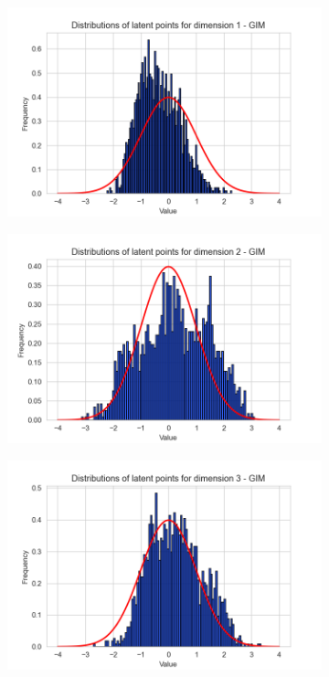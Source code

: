 \begin{figure}[h]
	\centering
	\begin{subfigure}[b]{0.25\textwidth}
		\centering
		\includegraphics[width=1\linewidth]{"graphs/distr/module2 kld0035/_ distribution_latent_space_GIM_dim=0"}
	\end{subfigure}
	\hfill
	\begin{subfigure}[b]{0.25\textwidth}
		\centering
		\includegraphics[width=1\linewidth]{"graphs/distr/module2 kld0035/_ distribution_latent_space_GIM_dim=1"}
	\end{subfigure}
	\hfill
	\begin{subfigure}[b]{0.25\textwidth}
		\centering
		\includegraphics[width=1\linewidth]{"graphs/distr/module2 kld0035/_ distribution_latent_space_GIM_dim=2"}

\end{subfigure}
\end{figure}
